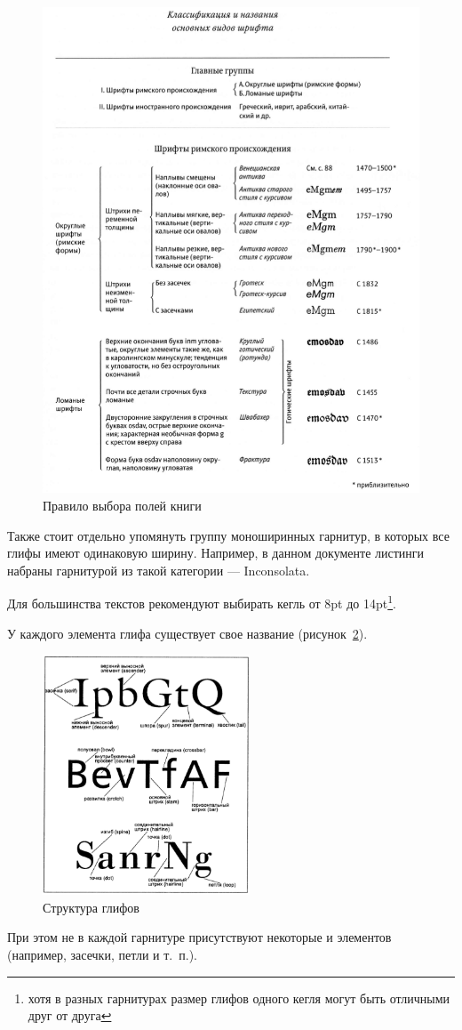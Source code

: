 \begin{figure}[H]
	\centering
	\includegraphics[width=\textwidth]{pics/fonts_class.png}
	\caption{Правило выбора полей книги}
	\label{fig:fonts_class}
\end{figure}

Также стоит отдельно упомянуть группу моноширинных гарнитур, в которых все глифы имеют одинаковую ширину. Например, в данном документе листинги набраны гарнитурой из такой категории --- Inconsolata.

Для большинства текстов рекомендуют выбирать кегль от 8pt до 14pt\footnote{хотя в разных гарнитурах размер глифов одного кегля могут быть отличными друг от друга}\cite{tschichold_aboutfont}.

У каждого элемента глифа существует свое название\cite{felichi_typo} (рисунок~\ref{fig:glyph_struct}).

\begin{figure}[H]
	\centering
	\includegraphics[width=0.55\textwidth]{pics/glyph_struct.png}
	\caption{Структура глифов}
	\label{fig:glyph_struct}
\end{figure}

При этом не в каждой гарнитуре присутствуют некоторые и элементов (например, засечки, петли и т.~п.)\cite{korolkova_livetypo}.
